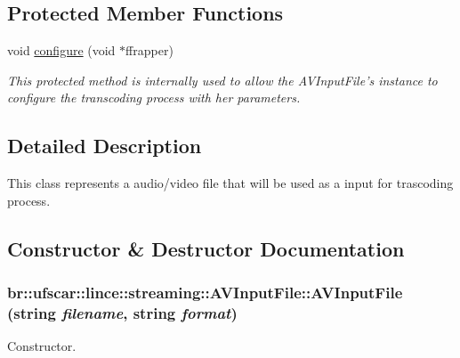 \subsection*{Protected Member Functions}
\begin{DoxyCompactItemize}
\item 
void \hyperlink{classbr_1_1ufscar_1_1lince_1_1streaming_1_1AVInputFile_a66e040fd681aa8bc79d4e86f01f62f5c}{configure} (void $\ast$ffrapper)
\begin{DoxyCompactList}\small\item\em This protected method is internally used to allow the AVInputFile's instance to configure the transcoding process with her parameters. \item\end{DoxyCompactList}\end{DoxyCompactItemize}


\subsection{Detailed Description}
This class represents a audio/video file that will be used as a input for trascoding process. 

\subsection{Constructor \& Destructor Documentation}
\hypertarget{classbr_1_1ufscar_1_1lince_1_1streaming_1_1AVInputFile_a30af8ac740b089f743e0233e31549699}{
\subsubsection[{AVInputFile}]{\setlength{\rightskip}{0pt plus 5cm}br::ufscar::lince::streaming::AVInputFile::AVInputFile (string {\em filename}, \/  string {\em format})}}
\label{classbr_1_1ufscar_1_1lince_1_1streaming_1_1AVInputFile_a30af8ac740b089f743e0233e31549699}


Constructor. 


